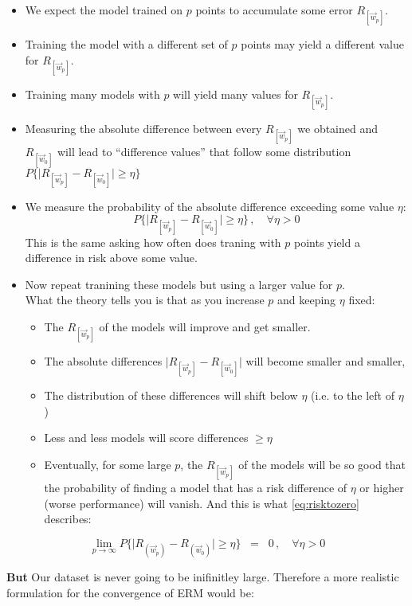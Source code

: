 {\begin{frame}
			\begin{itemize}
			\item We expect the model trained on $p$ points to accumulate some error $R_{[\vec w_p]}$.
			\item Training the model with a different set of $p$ points may yield a different value for $R_{[\vec w_p]}$.
			\item Training many models with $p$ will yield many values for $R_{[\vec w_p]}$.
			\item Measuring the absolute difference between every $R_{[\vec w_p]}$ we obtained and $R_{[\vec w_0]}$ will lead to ``difference values'' that follow some distribution $P\bigg\{ 
					{
						\Big|R_{[\vec w_p]} - R_{[\vec w_0]}\Big| 
					}
				\geq \eta \bigg\}$
			\item We measure the probability of the absolute difference exceeding some value $\eta$:
			\begin{equation}
			P\bigg\{ 
					{
						\Big|R_{[\vec w_p]} - R_{[\vec w_0]}\Big| 
					}
				\geq \eta \bigg\}\,, \quad \forall \eta > 0
			\end{equation}
			This is the same asking how often does traning with $p$ points yield a difference in risk above some value.
			\item Now repeat tranining these models but using a larger value for $p$.\\
			What the theory tells you is that as you increase $p$ and keeping $\eta$ fixed:
			\begin{itemize}
			\item The $R_{[\vec w_p]}$ of the models will improve and get smaller.
			\item The absolute differences $\Big|R_{[\vec w_p]} - R_{[\vec w_0]}\Big|$ will become smaller and smaller,
			\item The distribution of these differences will shift below $\eta$ (i.e. to the left of $\eta$)
			\item Less and less models will score differences $\ge \eta$
			\item Eventually, for some large $p$, the $R_{[\vec w_p]}$ of the models will be so good that the probability of finding a model that has a risk difference of $\eta$ or higher (worse performance) will vanish. And this is what \eqref{eq:risktozero} describes:
			\end{itemize}
			
			\end{itemize}
			
			\begin{equation}
				\lim_{p \to \infty} P\bigg\{ 
					{
						\Big|R_{(\vec w_p)} - R_{(\vec w_0)}\Big| 
					}
				\geq \eta \bigg\}\;\;=\;\; 0 \,, \quad \forall \eta > 0
				\label{eq:risktozero}
			\end{equation}
			
			\textbf{But} Our dataset is never going to be inifinitley large. Therefore a more realistic formulation for the convergence of ERM would be:
\end{frame}
}
